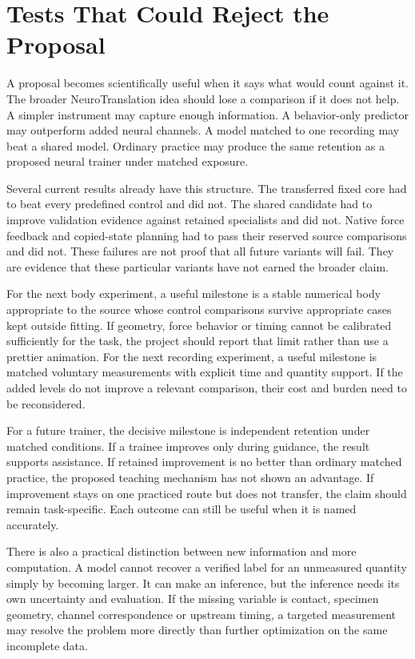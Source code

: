 \section{Tests That Could Reject the Proposal}

A proposal becomes scientifically useful when it says what would count against it. The broader NeuroTranslation idea should lose a comparison if it does not help. A simpler instrument may capture enough information. A behavior-only predictor may outperform added neural channels. A model matched to one recording may beat a shared model. Ordinary practice may produce the same retention as a proposed neural trainer under matched exposure.

Several current results already have this structure. The transferred fixed core had to beat every predefined control and did not. The shared candidate had to improve validation evidence against retained specialists and did not. Native force feedback and copied-state planning had to pass their reserved source comparisons and did not. These failures are not proof that all future variants will fail. They are evidence that these particular variants have not earned the broader claim.

For the next body experiment, a useful milestone is a stable numerical body appropriate to the source whose control comparisons survive appropriate cases kept outside fitting. If geometry, force behavior or timing cannot be calibrated sufficiently for the task, the project should report that limit rather than use a prettier animation. For the next recording experiment, a useful milestone is matched voluntary measurements with explicit time and quantity support. If the added levels do not improve a relevant comparison, their cost and burden need to be reconsidered.

For a future trainer, the decisive milestone is independent retention under matched conditions. If a trainee improves only during guidance, the result supports assistance. If retained improvement is no better than ordinary matched practice, the proposed teaching mechanism has not shown an advantage. If improvement stays on one practiced route but does not transfer, the claim should remain task-specific. Each outcome can still be useful when it is named accurately.

There is also a practical distinction between new information and more computation. A model cannot recover a verified label for an unmeasured quantity simply by becoming larger. It can make an inference, but the inference needs its own uncertainty and evaluation. If the missing variable is contact, specimen geometry, channel correspondence or upstream timing, a targeted measurement may resolve the problem more directly than further optimization on the same incomplete data.

